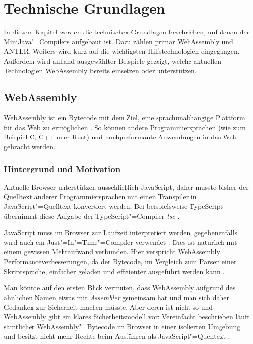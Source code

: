 \chapter{Technische Grundlagen}
\label{cha:Technische-Grundlagen}

In diesem Kapitel werden die technischen Grundlagen beschrieben, auf denen der MiniJava"=Compilers aufgebaut ist. Dazu zählen primär WebAssembly und ANTLR. Weiters wird kurz auf die wichtigsten Hilfstechnologien eingegangen. Außerdem wird anhand ausgewählter Beispiele gezeigt, welche aktuellen Technologien WebAssembly bereits einsetzen oder unterstützen.

\section{WebAssembly}
WebAssembly ist ein Bytecode mit dem Ziel, eine sprachunabhängige Plattform für das Web zu ermöglichen \cite{WebAssemblyWebsite} \cite{WebAssemblySpecification}. So können andere Programmiersprachen (wie zum Beispiel C, C++ oder Rust) und hochperformante Anwendungen in das Web gebracht werden.

\subsection{Hintergrund und Motivation}
Aktuelle Browser unterstützen ausschließlich JavaScript, daher musste bisher der Quelltext anderer Programmiersprachen mit einen Transpiler in JavaScript"=Quelltext konvertiert werden. Bei beispielsweise TypeScript übernimmt diese Aufgabe der TypeScript"=Compiler \emph{tsc} \cite{TypeScript}.

JavaScript muss im Browser zur Laufzeit interpretiert werden, gegebenenfalls wird auch ein Just"=In"=Time"=Compiler verwendet \cite{MDNJavaScript}. Dies ist natürlich mit einem gewissen Mehraufwand verbunden. Hier verspricht WebAssembly Performanceverbesserungen, da der Bytecode, im Vergleich zum Parsen einer Skriptsprache, einfacher geladen und effizienter ausgeführt werden kann \cite{WebAssemblySpecification}.

Man könnte auf den ersten Blick vermuten, dass WebAssembly aufgrund des ähnlichen Namen etwas mit \emph{Assembler} gemeinsam hat und man sich daher Gedanken zur Sicherheit machen müsste. Aber deren ist nicht so und WebAssembly gibt ein klares Sicherheitsmodell vor: Vereinfacht beschrieben läuft sämtlicher WebAssembly"=Bytecode im Browser in einer isolierten Umgebung und besitzt nicht mehr Rechte beim Ausführen als JavaScript"=Quelltext \cite{WebAssemblyWebsite} \cite{WebAssemblyW3CPressStandard}.

